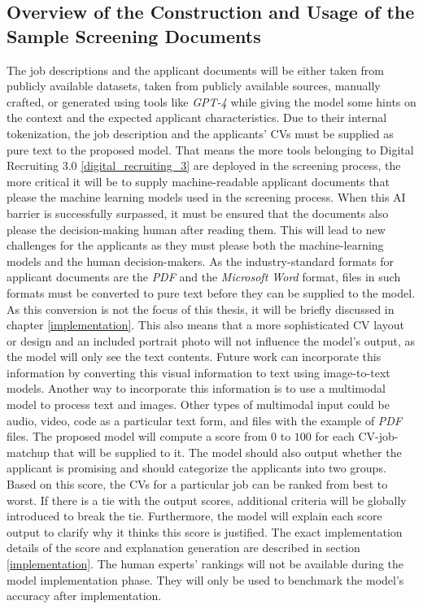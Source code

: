 \documentclass[draft,final]{thesisclass} %
\begin{document}
\subsection{Overview of the Construction and Usage of the Sample Screening Documents}
The job descriptions and the applicant documents will be either taken from publicly available datasets, taken from publicly available sources, manually crafted, or generated using tools like \textit{GPT-4} \parencite{gpt4} while giving the model some hints on the context and the expected applicant characteristics.
Due to their internal tokenization, the job description and the applicants' \acs{CV}s must be supplied as pure text to the proposed model.
That means the more tools belonging to Digital Recruiting 3.0 \ref{digital_recruiting_3} are deployed in the screening process, the more critical it will be to supply machine-readable applicant documents that please the machine learning models used in the screening process.
When this \acs{AI} barrier is successfully surpassed, it must be ensured that the documents also please the decision-making human after reading them.
This will lead to new challenges for the applicants as they must please both the machine-learning models and the human decision-makers.
As the industry-standard formats for applicant documents are the \textit{PDF} and the \textit{Microsoft Word} format, files in such formats must be converted to pure text before they can be supplied to the model.
As this conversion is not the focus of this thesis, it will be briefly discussed in chapter \ref{implementation}.
This also means that a more sophisticated \acs{CV} layout or design and an included portrait photo will not influence the model's output, as the model will only see the text contents.
Future work can incorporate this information by converting this visual information to text using image-to-text models.
Another way to incorporate this information is to use a multimodal model to process text and images.
Other types of multimodal input could be audio, video, code as a particular text form, and files with the example of \textit{PDF} files.
The proposed model will compute a score from $0$ to $100$ for each \acs{CV}-job-matchup that will be supplied to it.
The model should also output whether the applicant is promising and should categorize the applicants into two groups.
Based on this score, the \acs{CV}s for a particular job can be ranked from best to worst.
If there is a tie with the output scores, additional criteria will be globally introduced to break the tie.
Furthermore, the model will explain each score output to clarify why it thinks this score is justified.
The exact implementation details of the score and explanation generation are described in section \ref{implementation}.
The human experts' rankings will not be available during the model implementation phase. They will only be used to benchmark the model's accuracy after implementation.
\end{document}

